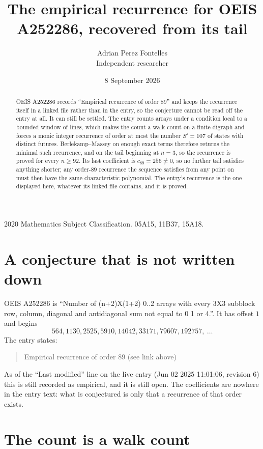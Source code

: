 \documentclass[11pt,a4paper]{article}
\title{The empirical recurrence for OEIS A252286, recovered from its tail}
\author{Adrian Perez Fontelles\\ \small Independent researcher}
\date{8 September 2026}
\theoremstyle{plain}
\theoremstyle{definition}
\begin{document}
\maketitle

\begin{abstract}
OEIS A252286 records ``Empirical recurrence of order $89$'' and keeps the recurrence itself in
a linked file rather than in the entry, so the conjecture cannot be read off the entry at all.
It can still be settled. The entry counts arrays under a condition local to a bounded window of
lines, which makes the count a walk count on a finite digraph and forces a monic integer
recurrence of order at most the number $S'=107$ of states with distinct futures. Berlekamp--Massey on
enough exact terms therefore returns the minimal such recurrence, and on the tail beginning at $n=3$, so the recurrence is proved for every $n\ge92$.
Its last coefficient is $c_{89}=256\neq0$, so no further tail satisfies anything
shorter; any order-$89$ recurrence the sequence satisfies from any point on must then have
the same characteristic polynomial. The entry's recurrence is the one displayed here, whatever
its linked file contains, and it is proved.
\end{abstract}

\noindent\small 2020 Mathematics Subject Classification. 05A15, 11B37, 15A18.\normalsize

\section{A conjecture that is not written down}

OEIS A252286 is ``Number of (n+2)X(1+2) 0..2 arrays with every 3X3 subblock row, column, diagonal and antidiagonal sum not equal to 0 1 or 4.''. It has offset $1$ and begins
\[
564, 1130, 2525, 5910, 14042, 33171, 79607, 192757,\ \dots
\]
The entry states:
\begin{quote}
Empirical recurrence of order 89 (see link above)
\end{quote}
As of the ``Last modified'' line on the live entry (Jun 02 2025 11:01:06, revision 6)
this is still recorded as empirical, and it is still open. The coefficients are nowhere in the
entry text: what is conjectured is only that a recurrence of that order exists.

\section{The count is a walk count}
\end{document}
